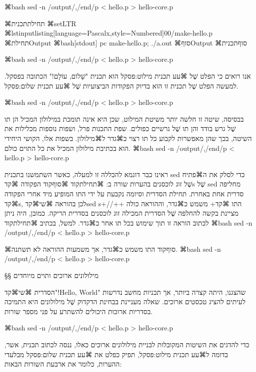⌘bash
sed -n /output/,/end/p < hello.p > hello-core.p
\END

⌘תחילת{תכנית}
⌘setLTR
⌘lstinputlisting[language=Pascalx,style=Numbered]{00/make-hello.p}
⌘תחילת{Output}
⌘bash[stdout]
pc make-hello.p; ./a.out
\END
⌘סוף{Output}\setRTL
{}
⌘סוף{תכנית}

⌘bash
sed -n /output/,/end/p < hello.p > hello-core.p
\END

אנו רואים כי הפלט שֶׁל ⌘עע תכנית מילוט:פסקל הוא תכנית "שָׁלוֹם, עוֹלָם!" הכתובה
בפסקל. למעשה הפלט שֶׁל תכנית זו הוא בדיוק הפקודות הביצועיות שֶׁל ⌘עע תכנית
שלום:פסקל.

⌘bash
sed -n /output/,/end/p < hello.p > hello-core.p
\END

בבסיסה, שיטה זו חלשה יותר משיטת המילוט, שכן היא אינה תומכת במילולון המכיל הן
תו שֶׁל גרש בודד והן תו שֶׁל גרשיים כפולים. שפת התכנות פרל, ושפות נוספות מכלילות
את השיטה, בכך שהן מאפשרות לקבוע כל תו רצוי כ⌘גדר ל⌘מילולון. בשפות אלו, הקושי
היחידי הוא בכתיבת מילולון המכיל את כל התוים כולם.
⌘bash
sed -n /output/,/end/p < hello.p > hello-core.p
\END

ראינו כבר דוגמא להכללה זו למעלה, כאשר השתמשנו בתכנית sed כדי לסלק
את ה⌘פתיח שֶׁל זוג לוכסנים בהערות שורה ב:
⌘תחילת{קוד}
⌘סוף{קוד}
הפקודה ⌘קד{s} שֶׁל sed מחליפה סדרית אחת באחרת. תחילת הסדרית וסיומה נקבעת על
ידי התו המופיע מיד אחרי הפקודה ⌘קד{s}, לכן בהוראה ⌘שי{⌘קד{sed s+//++}} התו
⌘קד{+} משמש כ⌘גדר, וההוראה כולה מציינת בקשה להחלפה שֶׁל הסדרית המכילה זוג
לוכסנים בסדרית הריקה. כמובן, היה ניתן לכתוב הוראה זו תוך שימוש בכל תו אחר
כ⌘גדר. למשל, בכתיב
⌘תחילת{קוד}
⌘bash
sed -n /output/,/end/p < hello.p > hello-core.p
\END

⌘סוף{קוד}
התו  משמש כ⌘גדר, אך משמעות ההוראה לא תשתנה.
⌘bash
sed -n /output/,/end/p < hello.p > hello-core.p
\END

§§ מילולונים ארוכים ותוים מיוחדים

הסדרית ⌘שי{⌘קד{"!Hello, World"}} שהצגנו, היתה קצרה ביותר, אך תכניות מחשב נדרשות
לעיתים להציג טכסטים ארוכים. שאלה מעניינת בבחינת הדקדוק שֶׁל מילולונים היא התמיכה
בסדריות ארוכות היכולים להשתרע על פני מספר שורות.

⌘bash
sed -n /output/,/end/p < hello.p > hello-core.p
\END

כדי להדגים את השיטות המקובלות לבניית מילולונים ארוכים כאלו, ננסה לכתוב תכנית,
אשר, בדומה ל⌘עע תכנית מילוט:פסקל, תפיק כפלט את ⌘עע תכנית שלום:פסקל מבלעדי
ההערות, כלומר את ארבעת השורות הבאות:

